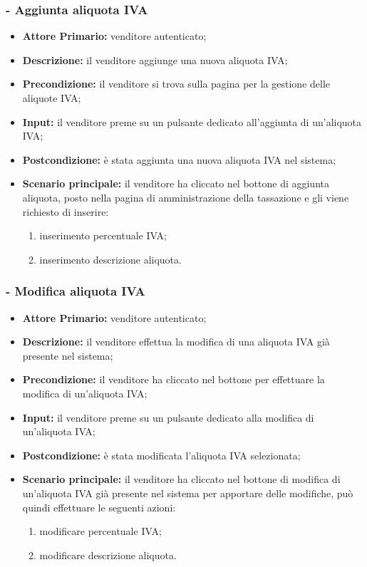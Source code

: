 \subsubsection{- Aggiunta aliquota IVA}
\begin{itemize}
    \item \textbf{Attore Primario:} venditore autenticato;
    \item \textbf{Descrizione:} il venditore aggiunge una nuova aliquota IVA;
    \item \textbf{Precondizione:} il venditore si trova sulla pagina per la gestione delle aliquote IVA;
    \item \textbf{Input:} il venditore preme su un pulsante dedicato all'aggiunta di un'aliquota IVA;
    \item \textbf{Postcondizione:} è stata aggiunta una nuova aliquota IVA nel sistema;
    \item \textbf{Scenario principale:} il venditore ha cliccato nel bottone di aggiunta aliquota, posto nella pagina di amministrazione della tassazione e gli viene richiesto di inserire:
          \begin{enumerate}
              \item inserimento percentuale IVA;
              \item inserimento descrizione aliquota.
          \end{enumerate}
\end{itemize}

\stepsubUserCase
\subsubsection{- Modifica aliquota IVA}
\begin{itemize}
    \item \textbf{Attore Primario:} venditore autenticato;
    \item \textbf{Descrizione:} il venditore effettua la modifica di una aliquota IVA già presente nel sistema;
    \item \textbf{Precondizione:} il venditore ha cliccato nel bottone per effettuare la modifica di un’aliquota IVA;
    \item \textbf{Input:} il venditore preme su un pulsante dedicato alla modifica di un'aliquota IVA;
    \item \textbf{Postcondizione:} è stata modificata l'aliquota IVA selezionata;
    \item \textbf{Scenario principale:} il venditore ha cliccato nel bottone di modifica di un’aliquota IVA già presente nel sistema per apportare delle modifiche, può quindi effettuare le seguenti azioni:
          \begin{enumerate}
              \item modificare percentuale IVA;
              \item modificare descrizione aliquota.
          \end{enumerate}
\end{itemize}

